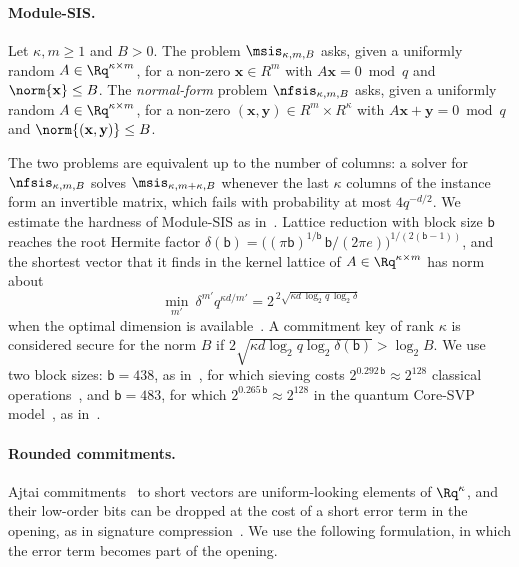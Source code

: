 \paragraph{Module-SIS.}
\begin{definition}\label{def:msis}
Let $\kappa,m\ge1$ and $B>0$. The problem $\msis_{\kappa,m,B}$ asks, given a uniformly random $A\in\Rq^{\kappa\times m}$, for a non-zero $\mathbf x\in R^m$ with $A\mathbf x=0\bmod q$ and $\norm{\mathbf x}\le B$. The \emph{normal-form} problem $\nfsis_{\kappa,m,B}$ asks, given a uniformly random $A\in\Rq^{\kappa\times m}$, for a non-zero $(\mathbf x,\mathbf y)\in R^m\times R^\kappa$ with $A\mathbf x+\mathbf y=0\bmod q$ and $\norm{(\mathbf x,\mathbf y)}\le B$.
\end{definition}
The two problems are equivalent up to the number of columns: a solver for $\nfsis_{\kappa,m,B}$ solves $\msis_{\kappa,m+\kappa,B}$ whenever the last $\kappa$ columns of the instance form an invertible matrix, which fails with probability at most $4q^{-d/2}$. We estimate the hardness of Module-SIS as in~\cite{BS23}. Lattice reduction with block size $\mathsf b$ reaches the root Hermite factor $\delta(\mathsf b)=\bigl((\pi\mathsf b)^{1/\mathsf b}\,\mathsf b/(2\pi e)\bigr)^{1/(2(\mathsf b-1))}$, and the shortest vector that it finds in the kernel lattice of $A\in\Rq^{\kappa\times m}$ has norm about
\begin{equation}\label{eq:mr}
\min_{m'}\ \delta^{m'}q^{\kappa d/m'}=2^{\,2\sqrt{\kappa d\,\log_2q\,\log_2\delta}}
\end{equation}
when the optimal dimension is available~\cite{MR09}. A commitment key of rank $\kappa$ is considered secure for the norm $B$ if $2\sqrt{\kappa d\log_2q\log_2\delta(\mathsf b)}>\log_2B$. We use two block sizes: $\mathsf b=438$, as in~\cite{BS23,NS24}, for which sieving costs $2^{0.292\,\mathsf b}\approx2^{128}$ classical operations~\cite{BDGL16}, and $\mathsf b=483$, for which $2^{0.265\,\mathsf b}\approx2^{128}$ in the quantum Core-SVP model~\cite{ADPS16}, as in~\cite{DBK26}.

\paragraph{Rounded commitments.}
Ajtai commitments~\cite{Ajt96} to short vectors are uniform-looking elements of $\Rq^\kappa$, and their low-order bits can be dropped at the cost of a short error term in the opening, as in signature compression~\cite{BG14,DKLLSSS18}. We use the following formulation, in which the error term becomes part of the opening.

